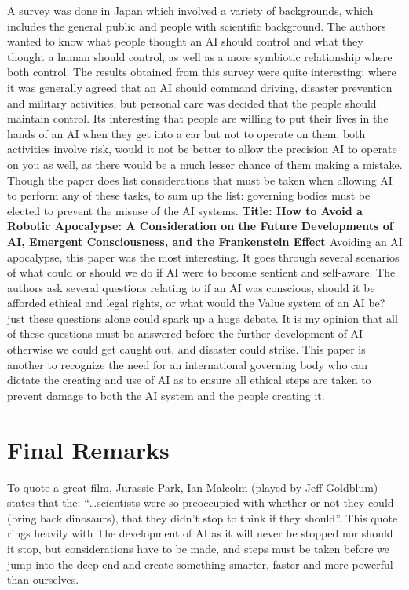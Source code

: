 \documentclass{scrartcl}
\begin{document}
A survey was done in Japan which involved a variety of backgrounds, which includes the general public and people with scientific background. The authors wanted to know what people thought an AI should control and what they thought a human should control, as well as a more symbiotic relationship where both control. The results obtained from this survey were quite interesting: where it was generally agreed that an AI should command driving, disaster prevention and military activities, but personal care was decided that the people should maintain control. Its interesting that people are willing to put their lives in the hands of an AI when they get into a car but not to operate on them, both activities involve risk, would it not be better to allow the precision AI to operate on you as well, as there would be a much lesser chance of them making a mistake. Though the paper does list considerations that must be taken when allowing AI to perform any of these tasks, to sum up the list: governing bodies must be elected to prevent the misuse of the AI systems. 
	\newline
	\newline
	\newline
	\textbf{Title: How to Avoid a Robotic Apocalypse: A Consideration on the Future Developments of AI, Emergent Consciousness, and the Frankenstein Effect \cite{Apocalypse}}
	\newline
Avoiding an AI apocalypse, this paper was the most interesting. It goes through several scenarios of what could or should we do if AI were to become sentient and self-aware. The authors ask several questions relating to if an AI was conscious, should it be afforded ethical and legal rights, or what would the Value system of an AI be? just these questions alone could spark up a huge debate. It is my opinion that all of these questions must be answered before the further development of AI otherwise we could get caught out, and disaster could strike. This paper is another to recognize the need for an international governing body who can dictate the creating and use of AI as to ensure all ethical steps are taken to prevent damage to both the AI system and the people creating it. 

\section{Final Remarks}
To quote a great film, Jurassic Park, Ian Malcolm (played by Jeff Goldblum) states that the: “…scientists were so preoccupied with whether or not they could (bring back dinosaurs), that they didn't stop to think if they should”\cite{Park}. This quote rings heavily with The development of AI as it will never be stopped nor should it stop, but considerations have to be made, and steps must be taken before we jump into the deep end and create something smarter, faster and more powerful than ourselves.  
	
	
	
	
	
	
\end{document}
